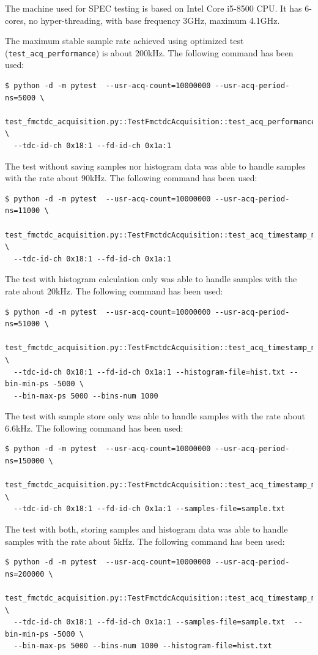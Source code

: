 \documentclass[a4paper, 12pt]{article}
\begin{document}
The machine used for SPEC testing is based on Intel Core i5-8500\cite{spec.cpu}
CPU.
It has 6-cores, no hyper-threading, with base frequency 3GHz, maximum 4.1GHz.

The maximum stable sample rate achieved using optimized test
(\texttt{test\_acq\_performance}) is
about 200kHz. The following command has been used:
\begin{lstlisting}
$ python -d -m pytest  --usr-acq-count=10000000 --usr-acq-period-ns=5000 \
  test_fmctdc_acquisition.py::TestFmctdcAcquisition::test_acq_performance \
  --tdc-id-ch 0x18:1 --fd-id-ch 0x1a:1
\end{lstlisting}

The test without saving samples nor histogram data was able to handle samples
with the rate about 90kHz.
The following command has been used:
\begin{lstlisting}
$ python -d -m pytest  --usr-acq-count=10000000 --usr-acq-period-ns=11000 \
  test_fmctdc_acquisition.py::TestFmctdcAcquisition::test_acq_timestamp_multiple_hist \
  --tdc-id-ch 0x18:1 --fd-id-ch 0x1a:1
\end{lstlisting}

The test with histogram calculation only was able to handle samples with the
rate about 20kHz. The following command has been used:
\begin{lstlisting}
$ python -d -m pytest  --usr-acq-count=10000000 --usr-acq-period-ns=51000 \
  test_fmctdc_acquisition.py::TestFmctdcAcquisition::test_acq_timestamp_multiple_hist \
  --tdc-id-ch 0x18:1 --fd-id-ch 0x1a:1 --histogram-file=hist.txt --bin-min-ps -5000 \
  --bin-max-ps 5000 --bins-num 1000
\end{lstlisting}

The test with sample store only was able to handle samples with the
rate about 6.6kHz. The following command has been used:
\begin{lstlisting}
$ python -d -m pytest  --usr-acq-count=10000000 --usr-acq-period-ns=150000 \
  test_fmctdc_acquisition.py::TestFmctdcAcquisition::test_acq_timestamp_multiple_hist \
  --tdc-id-ch 0x18:1 --fd-id-ch 0x1a:1 --samples-file=sample.txt
\end{lstlisting}

The test with both, storing samples and histogram data was able to handle
samples with the rate about 5kHz. The following command has been used:
\begin{lstlisting}
$ python -d -m pytest  --usr-acq-count=10000000 --usr-acq-period-ns=200000 \
  test_fmctdc_acquisition.py::TestFmctdcAcquisition::test_acq_timestamp_multiple_hist \
  --tdc-id-ch 0x18:1 --fd-id-ch 0x1a:1 --samples-file=sample.txt  --bin-min-ps -5000 \
  --bin-max-ps 5000 --bins-num 1000 --histogram-file=hist.txt
\end{lstlisting}
\end{document}
